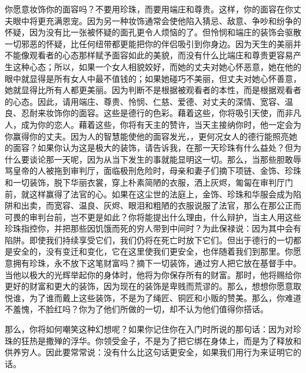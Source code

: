 你愿意妆饰你的面容吗？不要用珍珠，而要用端庄和尊贵。这样，你的面容在你丈夫眼中将更充满恩宠。因为另一种妆饰通常会使他陷入猜忌、敌意、争吵和纷争的怀疑，因为没有比一张被怀疑的面孔更令人烦恼的了。但怜悯和端庄的装饰会驱散一切邪恶的怀疑，比任何纽带都更能把你的伴侣吸引到你身边。因为天生的美丽并不能像观看者的心态那样赋予面容如此的美貌，而没有什么比端庄和尊贵更容易产生这种心态；所以，如果一个女人相貌姣好，而她的丈夫对她心怀恶意，她在他的眼中就显得是所有女人中最不值钱的；如果她碰巧不美丽，但丈夫对她心怀善意，她就显得比所有人都更美丽。因为判断不是根据被观看者的本性，而是根据观看者的心态。因此，请用端庄、尊贵、怜悯、仁慈、爱德、对丈夫的深情、宽容、温良、忍耐来妆饰你的面容。这些是德行的色彩。藉着这些，你将吸引天使，而非凡人，成为你的恋人。藉着这些，你将有天主的赞许，当天主接纳你时，他一定会为你赢得你的丈夫。因为人的智慧能使他的面容发光，，更何况女人的德行能照亮她的面容？如果你认为这是极大的装饰，请告诉我，在那一天珍珠有什么益处？但为什么要谈论那一天呢，因为从当下发生的事就能显明这一切。那么，当那些胆敢辱骂皇帝的人被拖到审判厅，面临极刑危险时，母亲和妻子们摘下项链、金饰、珍珠和一切装饰，脱下华丽衣裳，穿上朴素简陋的衣服，洒上灰烬，匍匐在审判厅门前，就这样赢得了法官的心。如果在这尘世的法庭上，金饰、珍珠和华服会成为陷阱和出卖，而宽容、温良、灰烬、眼泪和粗陋的衣服说服了法官，那么在那公正而可畏的审判台前，岂不更是如此？你将能提出什么理由，什么辩护，当主人用这些珍珠指控你，并把那些因饥饿而死的穷人带到中间时？为此保禄说：因为其中会有陷阱。即使我们持续享受它们，我们仍将在死亡时放下它们。但出于德行的一切都是安全的，没有变迁和变化，它在这里使我们更安全，也伴随着我们到那里。你愿意拥有珍珠，永不放下这笔财富吗？摘下一切装饰，通过穷人把它放在基督手中。当他以极大的光辉举起你的身体时，他将为你保存所有的财富。那时，他将赐给你更好的财富和更大的装饰，因为现在的装饰是卑贱而荒谬的。那么，想想你愿意取悦谁，为了谁而戴上这些装饰，不是为了绳匠、铜匠和小贩的赞美。那么，你难道不羞愧，不脸红吗？你为了他们所做的一切，却不认为他们值得你搭话。\par

那么，你将如何嘲笑这种幻想呢？如果你记住你在入门时所说的那句话：因为对珍珠的狂热是撒殚的浮华。你领受金子，不是为了把它绑在身体上，而是为了释放和供养穷人。因此要常常说：没有什么比这句话更安全，如果我们用行为来证明它的话。\par

